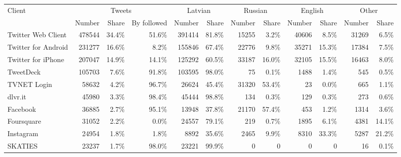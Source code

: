 \begin{tabular}{lrrrrrrrrrrr}
\toprule
\multirow{2}{*}{Client} & \multicolumn{3}{c}{Tweets} & \multicolumn{2}{c}{Latvian} & \multicolumn{2}{c}{Russian} & \multicolumn{2}{c}{English} & \multicolumn{2}{c}{Other} \\
\cmidrule(r){2-4} \cmidrule(r){5-6} \cmidrule(r){7-8} \cmidrule(r){9-10} \cmidrule(r){11-12}
{} &  Number & Share & By followed & Number & Share & Number & Share & Number & Share & Number & Share \\
\midrule
Twitter Web Client  &      478544 &       34.4\% &                51.6\% &            391414 &             81.8\% &             15255 &              3.2\% &             40606 &              8.5\% &            31269 &             6.5\% \\
Twitter for Android &      231277 &       16.6\% &                 8.2\% &            155846 &             67.4\% &             22776 &              9.8\% &             35271 &             15.3\% &            17384 &             7.5\% \\
Twitter for iPhone  &      207047 &       14.9\% &                14.1\% &            125292 &             60.5\% &             33187 &             16.0\% &             32105 &             15.5\% &            16463 &             8.0\% \\
TweetDeck           &      105703 &        7.6\% &                91.8\% &            103595 &             98.0\% &                75 &              0.1\% &              1488 &              1.4\% &              545 &             0.5\% \\
TVNET Login         &       58632 &        4.2\% &                96.7\% &             26624 &             45.4\% &             31320 &             53.4\% &                23 &              0.0\% &              665 &             1.1\% \\
dlvr.it             &       45980 &        3.3\% &                98.4\% &             45444 &             98.8\% &               134 &              0.3\% &               129 &              0.3\% &              273 &             0.6\% \\
Facebook            &       36885 &        2.7\% &                95.1\% &             13948 &             37.8\% &             21170 &             57.4\% &               453 &              1.2\% &             1314 &             3.6\% \\
Foursquare          &       31052 &        2.2\% &                 0.0\% &             24557 &             79.1\% &               219 &              0.7\% &              1895 &              6.1\% &             4381 &            14.1\% \\
Instagram           &       24954 &        1.8\% &                 1.8\% &              8892 &             35.6\% &              2465 &              9.9\% &              8310 &             33.3\% &             5287 &            21.2\% \\
SKATIES             &       23237 &        1.7\% &                98.0\% &             23221 &             99.9\% &                 0 &                 0 &                 0 &                 0 &               16 &             0.1\% \\
\bottomrule
\end{tabular}
